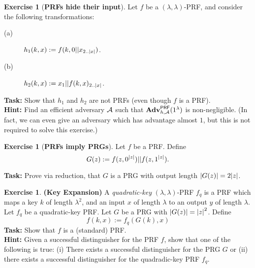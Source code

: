 \documentclass[envcountsame,runningheads,notitlepage]{../llncs}
\theoremstyle{definition}
\newtheorem{graded}[crossed]{Exercise}
\begin{document}
\clearpage





\begin{graded}[\textbf{PRFs hide their input}]
Let $f$ be a $(\lambda,\lambda)$-PRF, and consider the following transformations:
\begin{description}
\item[(a)] $h_1(k,x):=f(k,0||x_{2..\left\lvert x\right\rvert})$.
\item[(b)] $h_2(k,x):=x_1||f(k,x)_{2..\left\lvert x\right\rvert}$.
\end{description}
\textbf{Task:} Show that $h_1$ and $h_2$ are not PRFs (even though $f$ is a PRF).\\
\textbf{Hint:} Find an efficient adversary $\mathcal{A}$ such that $\mathbf{Adv}^{\mathsf{PRF}}_{h,\mathcal{A}}(1^\lambda)$ is non-negligible. (In fact, we can even give an adversary which has advantage almost $1$, but this is not required to solve this exercise.)
\end{graded}

\begin{graded}[\textbf{PRFs imply PRGs}]
  Let $f$ be a PRF. Define
	\[G(z):=f(z,0^{\left\lvert z\right\rvert})||f(z,1^{\left\lvert z\right\rvert}).\]

	\noindent
	\textbf{Task:}
	Prove via reduction, that $G$ is a
  PRG with output length $\abs{G(z)}=2\abs{z}$.
\end{graded}

\begin{graded}\textbf{(Key Expansion)}
A \emph{quadratic-key} $(\lambda,\lambda)$-PRF $f_q$ is a PRF which maps a key $k$ of length $\lambda^2$,
and an input $x$ of length $\lambda$ to an output $y$ of length $\lambda$. Let $f_q$ be a quadratic-key PRF.
Let $G$ be a PRG with $\left\lvert G(z)\right\rvert=\left\lvert z\right\rvert^2$. Define
\[f(k,x):=f_q(G(k),x)\]
\textbf{Task:} Show that $f$ is a (standard) PRF.\\
\textbf{Hint:} Given a successful distinguisher for the PRF $f$, show that one of the following is true: (i) There exists a successful distinguisher for the PRG $G$ or (ii) there exists a successful distinguisher for the quadradic-key PRF $f_q$.
\end{graded}
\end{document}
